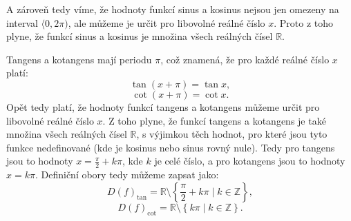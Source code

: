 \documentclass[12pt,a4paper]{article}
\begin{document}
A zároveň tedy víme, že hodnoty funkcí sinus a kosinus nejsou jen omezeny na interval $\langle 0, 2\pi)$,
ale můžeme je určit pro libovolné reálné číslo $x$. Proto z toho plyne, že  funkcí sinus a kosinus je množina všech reálných čísel $\mathbb{R}$.

\begin{center}
\end{center}

\begin{center}
\end{center}


Tangens a kotangens mají periodu $\pi$, což znamená, že pro každé reálné číslo $x$ platí:
\[\tan(x + \pi) = \tan x,\]
\[\cot(x + \pi) = \cot x.\]
Opět tedy platí, že hodnoty funkcí tangens a kotangens můžeme určit pro libovolné reálné číslo $x$.
Z toho plyne, že  funkcí tangens a kotangens je také množina všech reálných čísel $\mathbb{R}$,
s výjimkou těch hodnot, pro které jsou tyto funkce nedefinované (kde je kosinus nebo sinus rovný nule).
Tedy pro tangens jsou to hodnoty $x = \frac{\pi}{2} + k\pi$, kde $k$ je celé číslo, a pro kotangens jsou to hodnoty $x = k\pi$.
Definiční obory tedy můžeme zapsat jako:
\[D(f)_{\tan} = \mathbb{R} \setminus \left\{ \frac{\pi}{2} + k\pi \mid k \in \mathbb{Z} \right\},\]
\[D(f)_{\cot} = \mathbb{R} \setminus \left\{ k\pi \mid k \in \mathbb{Z} \right\}.\]
\end{document}
